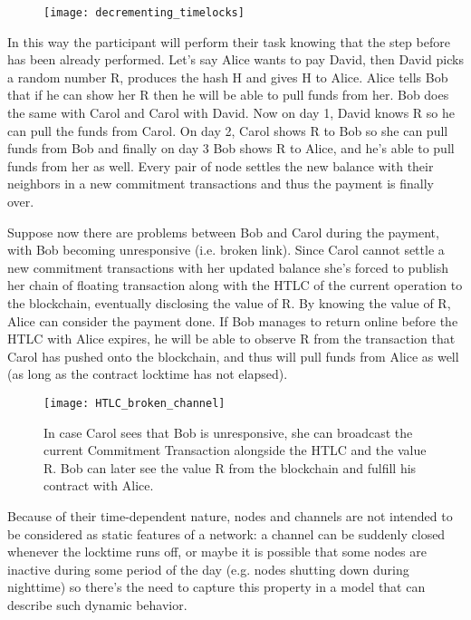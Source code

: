 		\begin{figure}[h]
			\centering
			\texttt{[image: decrementing\_timelocks]}
		\end{figure}
	
		In this way the participant will perform their task knowing that the step before has been already performed. Let's say Alice wants to pay David, then David picks a random number R, produces the hash H and gives H to Alice. Alice tells Bob that if he can show her R then he will be able to pull funds from her. Bob does the same with Carol and Carol with David. Now on day 1, David knows R so he can pull the funds from Carol. On day 2, Carol shows R to Bob so she can pull funds from Bob and finally on day 3 Bob shows R to Alice, and he's able to pull funds from her as well. Every pair of node settles the new balance with their neighbors in a new commitment transactions and thus the payment is finally over.
		
		Suppose now there are problems between Bob and Carol during the payment, with Bob becoming unresponsive (i.e. broken link). Since Carol cannot settle a new commitment transactions with her updated balance she's forced to publish her chain of floating transaction along with the HTLC of the current operation to the blockchain, eventually disclosing the value of R. By knowing the value of R, Alice can consider the payment done. If Bob manages to return online before the HTLC with Alice expires, he will be able to observe R from the transaction that Carol has pushed onto the blockchain, and thus will pull funds from Alice as well (as long as the contract locktime has not elapsed).
		
		\begin{figure}[h]
			\centering
			\texttt{[image: HTLC\_broken\_channel]}
			\caption{In case Carol sees that Bob is unresponsive, she can broadcast the current Commitment Transaction alongside the HTLC and the value R. Bob can later see the value R from the blockchain and fulfill his contract with Alice.}
		\end{figure}
		
		Because of their time-dependent nature, nodes and channels are not intended to be considered as static features of a network: a channel can be suddenly closed whenever the locktime runs off, or maybe it is possible that some nodes are inactive during some period of the day (e.g. nodes shutting down during nighttime) so there's the need to capture this property in a model that can describe such dynamic behavior.
		
	